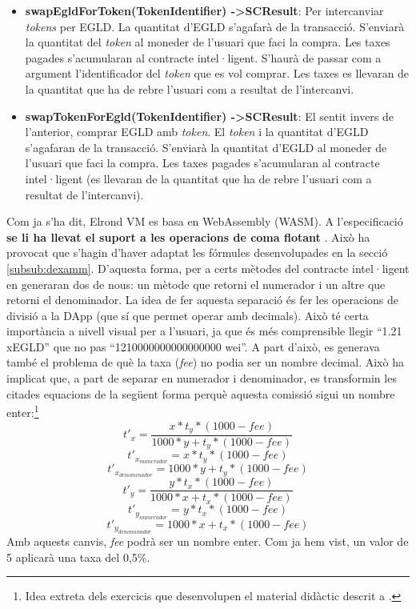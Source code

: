 \documentclass[11pt,a4paper]{article}
\begin{document}
\begin{itemize}
\item \textbf{swapEgldForToken(TokenIdentifier) -\textgreater SCResult}: Per intercanviar \textit{tokens} per EGLD. La quantitat d'EGLD s'agafarà de la transacció. S'enviarà la quantitat del \textit{token} al moneder de l'usuari que faci la compra. Les taxes pagades s'acumularan al contracte intel·ligent. S'haurà de passar com a argument l'identificador del \textit{token} que es vol comprar. Les taxes es llevaran de la quantitat que ha de rebre l'usuari com a resultat de l'intercanvi.
\item \textbf{swapTokenForEgld(TokenIdentifier) -\textgreater SCResult}: El sentit invers de l'anterior, comprar EGLD amb \textit{token}. El \textit{token} i la quantitat d'EGLD s'agafaran de la transacció. S'enviarà la quantitat d'EGLD al moneder de l'usuari que faci la compra. Les taxes pagades s'acumularan al contracte intel·ligent (es llevaran de la quantitat que ha de rebre l'usuari com a resultat de l'intercanvi).
\end{itemize}
 
Com ja s'ha dit, Elrond VM es basa en WebAssembly (WASM). A l'especificació \textbf{se li ha llevat el suport a les operacions de coma flotant} \cite{mincub2020}. Això ha provocat que s'hagin d'haver adaptat les fórmules desenvolupades en la secció \ref{subsub:dexamm}. D'aquesta forma, per a certs mètodes del contracte intel·ligent en generaran dos de nous: un mètode que retorni el numerador i un altre que retorni el denominador. La idea de fer aquesta separació és fer les operacions de divisió a la DApp (que sí que permet operar amb decimals). Això té certa importància a nivell visual per a l'usuari, ja que és més comprensible llegir ``1.21 xEGLD'' que no pas ``1210000000000000000 wei''. A part d'això, es generava també el problema de què la taxa (\textit{fee}) no podia ser un nombre decimal. Això ha implicat que, a part de separar en numerador i denominador, es transformin les citades equacions de la següent forma perquè aquesta comissió sigui un nombre enter:\footnote{Idea extreta dels exercicis que desenvolupen el material didàctic descrit a \cite{delarosa}.}
\[t'_x = \frac{x * t_y *(1000 - fee)}{1000 * y + t_y * (1000 - fee)}\]
\[t'_{x_{numerador}} = x * t_y *(1000 - fee)\]
\[t'_{x_{denominador}} = 1000 * y + t_y * (1000 - fee)\]
\[t'_y = \frac{y * t_x * (1000 - fee)}{1000 * x + t_x * (1000 - fee)} \]
\[t'_{y_{numerador}} = y * t_x * (1000 - fee)\]
\[t'_{y_{denominador}} = 1000 * x + t_x * (1000 - fee)\]
Amb aquests canvis, \textit{fee} podrà ser un nombre enter. Com ja hem vist, un valor de 5 aplicarà una taxa del 0,5\%.
\end{document}
